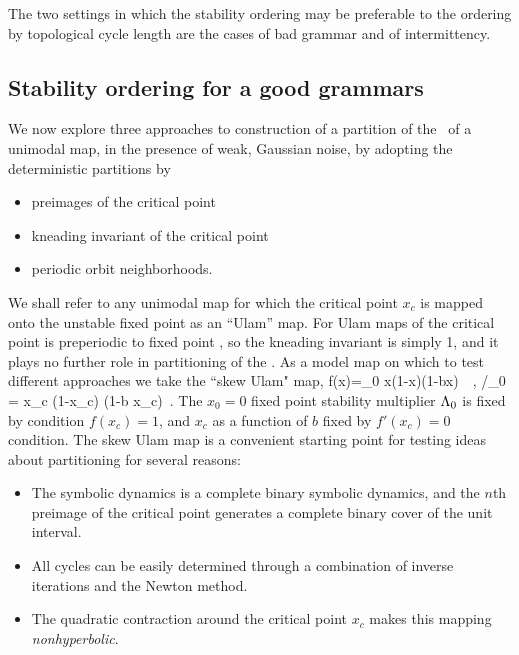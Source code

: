 The two settings in which the stability ordering may be preferable to
the ordering by topological cycle length are the cases of bad grammar
and of intermittency.


\subsection{Stability ordering for a good grammars}

We now  explore three
approaches to construction of a partition of
the \statesp\ of a unimodal map,
in the presence of weak, Gaussian noise, by
adopting the deterministic partitions by
\begin{itemize}
    \item preimages of the critical point
    \item kneading invariant of the critical point
    \item periodic orbit neighborhoods.
\end{itemize}

%
%
We shall refer to any unimodal map for which
the critical point $x_c$ is
mapped onto the unstable fixed point  as an ``Ulam'' map.
For Ulam maps of the critical point is preperiodic to fixed
point , so the kneading invariant
is simply 1, and it plays no further role in partitioning
of the \statesp.
As a model map on which to test different approaches
we take the ``skew Ulam" map,
\beq
f(x)=\ExpaEig_0 x(1-x)(1-bx) \,\, , /\ExpaEig_0  = x_c (1-x_c) (1-b x_c) \,.
\label{exmp:skew_Ulam}
\eeq
The $x_0=0$ fixed point  stability multiplier $\Lambda_0$
is fixed by condition $f(x_c)=1$, and $x_c$ as a  function
of $b$ fixed by $f'(x_c)=0$ condition.
The skew Ulam map
is a convenient starting point for testing
ideas about partitioning for several reasons:
\begin{itemize}
\item
The symbolic dynamics is a complete binary symbolic dynamics,
and the $n$th preimage
of the critical point generates a complete binary cover
of the unit interval.

\item
All cycles can be easily determined through a combination of
inverse iterations %
and the Newton method. %

\item
The quadratic contraction around the critical point
$x_c$ makes this  mapping {\em nonhyperbolic}.

\end{itemize}


